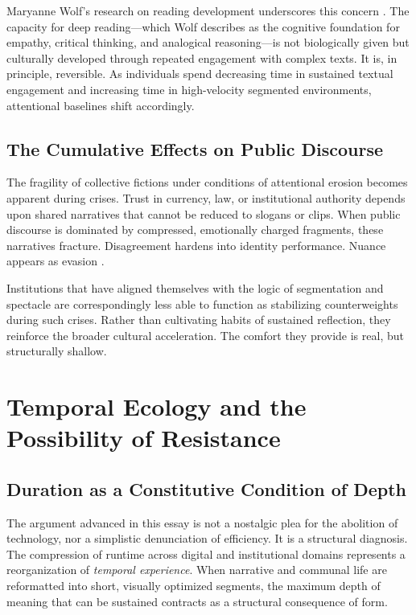 \documentclass[12pt]{article}
\theoremstyle{definition}
\theoremstyle{plain}
\begin{document}
Maryanne Wolf's research on reading development underscores this concern \citep{Wolf2018}. The capacity for deep reading---which Wolf describes as the cognitive foundation for empathy, critical thinking, and analogical reasoning---is not biologically given but culturally developed through repeated engagement with complex texts. It is, in principle, reversible. As individuals spend decreasing time in sustained textual engagement and increasing time in high-velocity segmented environments, attentional baselines shift accordingly.

\subsection{The Cumulative Effects on Public Discourse}

The fragility of collective fictions under conditions of attentional erosion becomes apparent during crises. Trust in currency, law, or institutional authority depends upon shared narratives that cannot be reduced to slogans or clips. When public discourse is dominated by compressed, emotionally charged fragments, these narratives fracture. Disagreement hardens into identity performance. Nuance appears as evasion \citep{Lanier2018}.

Institutions that have aligned themselves with the logic of segmentation and spectacle are correspondingly less able to function as stabilizing counterweights during such crises. Rather than cultivating habits of sustained reflection, they reinforce the broader cultural acceleration. The comfort they provide is real, but structurally shallow.

\section{Temporal Ecology and the Possibility of Resistance}
\label{sec:ecology}

\subsection{Duration as a Constitutive Condition of Depth}

The argument advanced in this essay is not a nostalgic plea for the abolition of technology, nor a simplistic denunciation of efficiency. It is a structural diagnosis. The compression of runtime across digital and institutional domains represents a reorganization of \emph{temporal experience}. When narrative and communal life are reformatted into short, visually optimized segments, the maximum depth of meaning that can be sustained contracts as a structural consequence of form.
\end{document}
